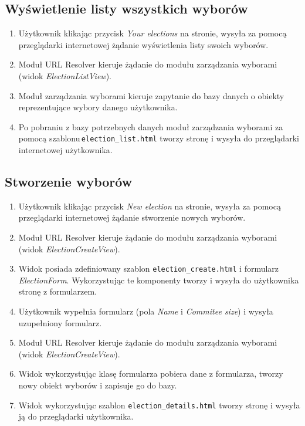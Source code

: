 \documentclass[pdflatex,11pt]{../aghdoc_version2}
\newcommand{\code}[1]{\texttt{#1}}
\begin{document}
\subsection{Wyświetlenie listy wszystkich wyborów}
\begin{enumerate}
\item Użytkownik klikając przycisk \textit{Your elections} na stronie, wysyła za pomocą
przeglądarki internetowej żądanie wyświetlenia listy swoich wyborów.
\item Moduł URL Resolver kieruje żądanie do modułu zarządzania wyborami (widok
\textit{ElectionListView}).
\item Moduł zarządzania wyborami kieruje zapytanie do bazy danych o obiekty
reprezentujące wybory danego użytkownika.
\item Po pobraniu z bazy potrzebnych danych moduł zarządzania wyborami za pomocą
szablonu\,\code{election\_list.html} tworzy stronę i wysyła do przeglądarki internetowej
użytkownika.
\end{enumerate}

\subsection{Stworzenie wyborów}
\begin{enumerate}
\item Użytkownik klikając przycisk \textit{New election} na stronie, wysyła za pomocą
przeglądarki internetowej żądanie stworzenie nowych wyborów.
\item Moduł URL Resolver kieruje żądanie do modułu zarządzania wyborami (widok
\textit{ElectionCreateView}).
\item Widok posiada zdefiniowany szablon \code{election\_create.html} i formularz \textit{ElectionForm}.
Wykorzystując te komponenty tworzy i wysyła do użytkownika stronę z formularzem.
\item Użytkownik wypełnia formularz (pola \textit{Name} i \textit{Commitee size}) i wysyła uzupełniony
formularz.
\item Moduł URL Resolver kieruje żądanie do modułu zarządzania wyborami (widok
\textit{ElectionCreateView}).
\item Widok wykorzystując klasę formularza pobiera dane z formularza, tworzy nowy
obiekt wyborów i zapisuje go do bazy.
\item Widok wykorzystując szablon \code{election\_details.html} tworzy stronę i wysyła ją do
przeglądarki użytkownika.
\end{enumerate}
\clearpage
\end{document}

